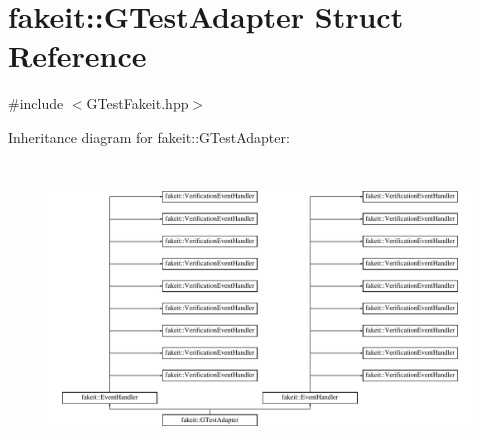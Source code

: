 \hypertarget{structfakeit_1_1GTestAdapter}{}\section{fakeit\+::G\+Test\+Adapter Struct Reference}
\label{structfakeit_1_1GTestAdapter}


{\ttfamily \#include $<$G\+Test\+Fakeit.\+hpp$>$}

Inheritance diagram for fakeit\+::G\+Test\+Adapter\+:\begin{figure}[H]
\begin{center}
\leavevmode
\includegraphics[height=7.777778cm]{structfakeit_1_1GTestAdapter}
\end{center}
\end{figure}
